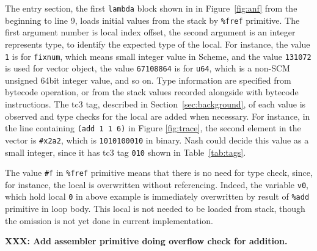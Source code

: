 \documentclass[preprint, numbers]{sigplanconf}
\begin{document}
The entry section, the first \texttt{lambda} block shown in in
Figure~\hyperref[fig:anf]{\ref{fig:anf}} from the beginning to line 9,
loads initial values from the stack by \texttt{\%fref} primitive. The first
argument number is local index offset, the second argument is an integer
represents type, to identify the expected type of the local. For instance, the
value \texttt{1} is for \texttt{fixnum}, which means small integer value in
Scheme, and the value \texttt{131072} is used for vector object, the value
\texttt{67108864} is for \texttt{u64}, which is a non-SCM unsigned 64bit
integer value, and so on. Type information are specified from bytecode
operation, or from the stack values recorded alongside with bytecode
instructions. The tc3 tag, described in Section~\ref{sec:background}, of each
value is observed and type checks for the local are added when necessary. For
instance, in the line containing \texttt{(add 1 1 6)} in Figure
\hyperref[fig:trace]{\ref{fig:trace}}, the second element in the vector is
\texttt{\#x2a2}, which is \texttt{1010100010} in binary. Nash could decide
this value as a small integer, since it has tc3 tag \texttt{010} shown in
Table~\hyperref[tab:tags]{\ref{tab:tags}}.

The value \texttt{\#f} in \texttt{\%fref} primitive means that there is no
need for type check, since, for instance, the local is overwritten without
referencing. Indeed, the variable \texttt{v0}, which hold local \texttt{0} in
above example is immediately overwritten by result of \texttt{\%add} primitive
in loop body. This local is not needed to be loaded from stack, though the
omission is not yet done in current implementation.

\textbf{XXX: Add assembler primitive doing overflow check for addition.}
\end{document}
